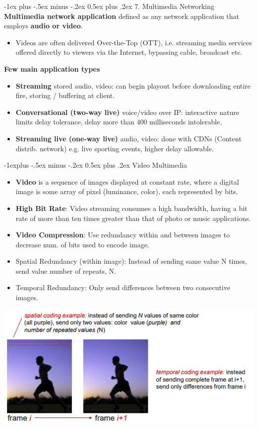 \documentclass[12pt, landscape]{article}
\makeatletter
\renewcommand{\section}{\@startsection{section}{1}{0mm}%
                                {-1ex plus -.5ex minus -.2ex}%
                                {0.5ex plus .2ex}%
                                {\normalfont\large\bfseries}}
\renewcommand{\subsection}{\@startsection{subsection}{2}{0.1mm}%
                                {-1explus -.5ex minus -.2ex}%
                                {0.5ex plus .2ex}%
                                {\normalfont\normalsize\bfseries}}
\makeatother
\begin{document}
\begin{multicols*}{3}
\section{7. Multimedia Networking}
\textbf{Multimedia network application} defined as any network application that employs \textbf{audio or video}. 
\begin{itemize}
\item Videos are often delivered Over-the-Top (OTT), i.e. streaming media services offered directly to viewers via the Internet, bypassing cable, broadcast etc.
\end{itemize}
 \textbf{Few main application types}
\begin{itemize}
\item \textbf{Streaming} stored audio, video: can begin playout before downloading entire fire, storing / buffering at client.
\item \textbf{Conversational (two-way live)} voice/video over IP: interactive nature limits delay tolerance, delay more than 400 milliseconds intolerable.
\item \textbf{Streaming live (one-way live)} audio, video: done with CDNs (Content distrib. network) e.g. live sporting events, higher delay allowable. 
\end{itemize}


\subsection{Video Multimedia}
\begin{itemize}
\item \textbf{Video} is a sequence of images displayed at constant rate, where a digital image is some array of pixel (luminance, color), each represented by bits.
\item \textbf{High Bit Rate}: Video streaming consumes a high bandwidth, having a bit rate of more than ten times
greater than that of photo or music applications.
\item \textbf{Video Compression}: Use redundancy within and between images to decrease num. of bits used to encode image.
\item Spatial Redundancy (within image): Instead of sending same value N times, send value number of repeats, N.
\item Temporal Redundancy: Only send differences between two consecutive images.
\end{itemize}
\centerline{\includegraphics[width=0.8\linewidth]{vidcompress}}


\end{multicols*}
\end{document}
